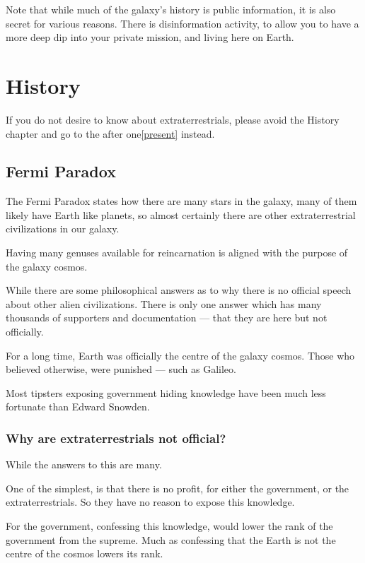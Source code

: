 \documentclass{report}
\begin{document}
Note that while much of the galaxy's history is public information, it is also
secret for various reasons. There is disinformation activity, to allow you to
have a more deep dip into your private mission, and living here on Earth.


\chapter{History}

If you do not desire to know about extraterrestrials, please avoid the History
chapter and go to the after one\ref{present} instead.

\section{Fermi Paradox}
The Fermi Paradox states how there are many stars in the galaxy, many of them
likely have Earth like planets, so almost certainly there are other
extraterrestrial civilizations in our galaxy. 

Having many genuses available for reincarnation is aligned with the purpose of
the galaxy cosmos.

While there are some philosophical answers as to why there is no official speech 
about other alien civilizations. There is only one answer which has many
thousands of supporters and documentation --- that they are here but not officially. 

For a long time, Earth was officially the centre of the galaxy cosmos. Those who
believed otherwise, were punished --- such as Galileo.

Most tipsters exposing government hiding knowledge have been much less fortunate
 than Edward Snowden.

\subsection{Why are extraterrestrials not official?}
While the answers to this are many. 

One of the simplest, is that there is no profit, for either the government, or
the extraterrestrials.  So they have no reason to expose this knowledge.

For the government, confessing this knowledge, would lower the rank of the
government from the supreme. Much as confessing that the Earth is not the centre
of the cosmos lowers its rank.
\end{document}
